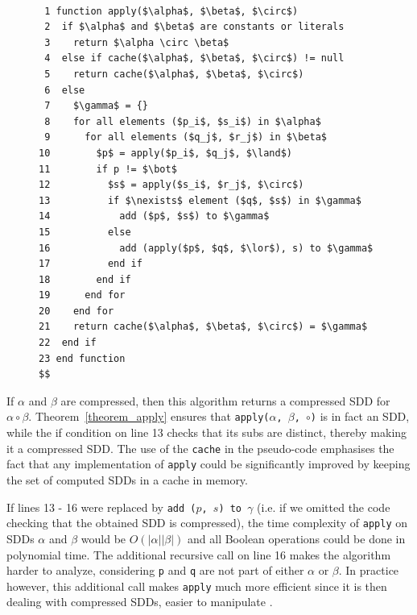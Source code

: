 \documentclass[11pt]{report}
\begin{document}
\label{operations}
 \begin{figure}
 
\begin{lstlisting}[mathescape]

 1 function apply($\alpha$, $\beta$, $\circ$)
 2  if $\alpha$ and $\beta$ are constants or literals
 3    return $\alpha \circ \beta$   
 4  else if cache($\alpha$, $\beta$, $\circ$) != null
 5    return cache($\alpha$, $\beta$, $\circ$)
 6  else
 7    $\gamma$ = {}
 8    for all elements ($p_i$, $s_i$) in $\alpha$
 9      for all elements ($q_j$, $r_j$) in $\beta$ 
10        $p$ = apply($p_i$, $q_j$, $\land$)
11        if p != $\bot$
12          $s$ = apply($s_i$, $r_j$, $\circ$)
13          if $\nexists$ element ($q$, $s$) in $\gamma$
14            add ($p$, $s$) to $\gamma$
15          else 
16            add (apply($p$, $q$, $\lor$), s) to $\gamma$
17          end if
18        end if
19      end for
20    end for
21    return cache($\alpha$, $\beta$, $\circ$) = $\gamma$
22  end if
23 end function
$$
\end{lstlisting}
 \end{figure}


If $\alpha$ and $\beta$ are compressed, then this algorithm returns a compressed SDD for $\alpha \circ \beta$. 
Theorem~\ref{theorem_apply} ensures that \texttt{apply($\alpha$, $\beta$, $\circ$)} is in fact an SDD, while the if condition on line 13 checks that its subs are distinct, thereby making it a compressed SDD. The use of the \texttt{cache} in the pseudo-code emphasises the fact that any implementation of \texttt{apply} could be significantly improved by keeping the set of computed SDDs in a cache in memory. 

If lines 13 - 16 were replaced by \texttt{add ($p$, $s$) to $\gamma$} (i.e. if we omitted the code checking that the obtained SDD is compressed), the time complexity of \texttt{apply} on SDDs $\alpha$ and $\beta$ would be $O(|\alpha||\beta|)$ and all Boolean operations could be done in polynomial time. 
The additional recursive call on line 16 makes the algorithm harder to analyze, considering \texttt{p} and \texttt{q} are not part of either $\alpha$ or $\beta$. In practice however, this additional call makes \texttt{apply} much more efficient since it is then dealing with compressed SDDs, easier to manipulate \cite{sdd_1}. 
\end{document}
